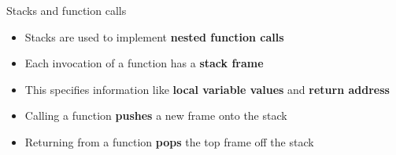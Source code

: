 \begin{frame}{Stacks and function calls}
	\begin{itemize}
		\pause\item Stacks are used to implement \textbf{nested function calls}
		\pause\item Each invocation of a function has a \textbf{stack frame}
		\pause\item This specifies information like \textbf{local variable values} and \textbf{return address}
		\pause\item Calling a function \textbf{pushes} a new frame onto the stack
		\pause\item Returning from a function \textbf{pops} the top frame off the stack
	\end{itemize}
\end{frame}
